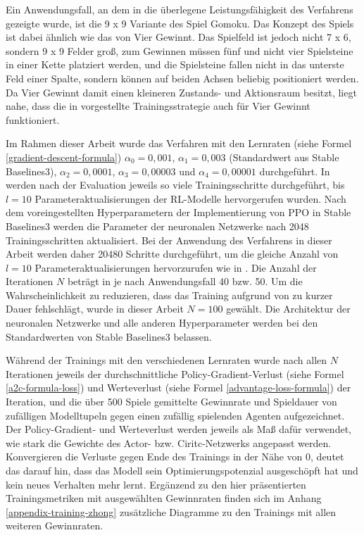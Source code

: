 Ein Anwendungsfall, an dem in \cite{Zhong.2020} die überlegene Leistungsfähigkeit des Verfahrens gezeigte wurde, ist die 9 x 9 Variante des Spiel Gomoku. Das Konzept des Spiels ist dabei ähnlich wie das von Vier Gewinnt. Das Spielfeld ist jedoch nicht 7 x 6, sondern 9 x 9 Felder groß, zum Gewinnen müssen fünf und nicht vier Spielsteine in einer Kette platziert werden, und die Spielsteine fallen nicht in das unterste Feld einer Spalte, sondern können auf beiden Achsen beliebig positioniert werden. Da Vier Gewinnt damit einen kleineren Zustands- und Aktionsraum besitzt, liegt nahe, dass die in \cite{Zhong.2020} vorgestellte Trainingsstrategie auch für Vier Gewinnt funktioniert.


Im Rahmen dieser Arbeit wurde das Verfahren mit den Lernraten (siehe Formel \ref{gradient-descent-formula}) $\alpha_0 = 0,001$, $\alpha_1 = 0,003$ (Standardwert aus Stable Baselines3), $\alpha_2 = 0,0001$, $\alpha_3 = 0,00003$ und $\alpha_4 = 0,00001$ durchgeführt. In \cite{Zhong.2020} werden nach der Evaluation jeweils so viele Trainingsschritte durchgeführt, bis $l = 10$ Parameteraktualisierungen der RL-Modelle hervorgerufen wurden. Nach dem voreingestellten Hyperparametern der Implementierung von PPO in Stable Baselines3 werden die Parameter der neuronalen Netzwerke nach 2048 Trainingsschritten aktualisiert. Bei der Anwendung des Verfahrens in dieser Arbeit werden daher 20480 Schritte durchgeführt, um die gleiche Anzahl von $l = 10$ Parameteraktualisierungen hervorzurufen wie in \cite{Zhong.2020}. Die Anzahl der Iterationen $N$ beträgt in \cite{Zhong.2020} je nach Anwendungsfall 40 bzw. 50. Um die Wahrscheinlichkeit zu reduzieren, dass das Training aufgrund von zu kurzer Dauer fehlschlägt, wurde in dieser Arbeit $N = 100$ gewählt. Die Architektur der neuronalen Netzwerke und alle anderen Hyperparameter werden bei den Standardwerten von Stable Baselines3 belassen.

Während der Trainings mit den verschiedenen Lernraten wurde nach allen $N$ Iterationen jeweils der durchschnittliche Policy-Gradient-Verlust (siehe Formel \ref{a2c-formula-loss}) und Werteverlust (siehe Formel \ref{advantage-loss-formula}) der Iteration, und die über 500 Spiele gemittelte Gewinnrate und Spieldauer von zufälligen Modelltupeln gegen einen zufällig spielenden Agenten aufgezeichnet. Der Policy-Gradient- und Werteverlust werden jeweils als Maß dafür verwendet, wie stark die Gewichte des Actor- bzw. Ciritc-Netzwerks angepasst werden. Konvergieren die Verluste gegen Ende des Trainings in der Nähe von 0, deutet das darauf hin, dass das Modell sein Optimierungspotenzial ausgeschöpft hat und kein neues Verhalten mehr lernt. Ergänzend zu den hier präsentierten Trainingsmetriken mit ausgewählten Gewinnraten finden sich im Anhang \ref{appendix-training-zhong} zusätzliche Diagramme zu den Trainings mit allen weiteren Gewinnraten.

